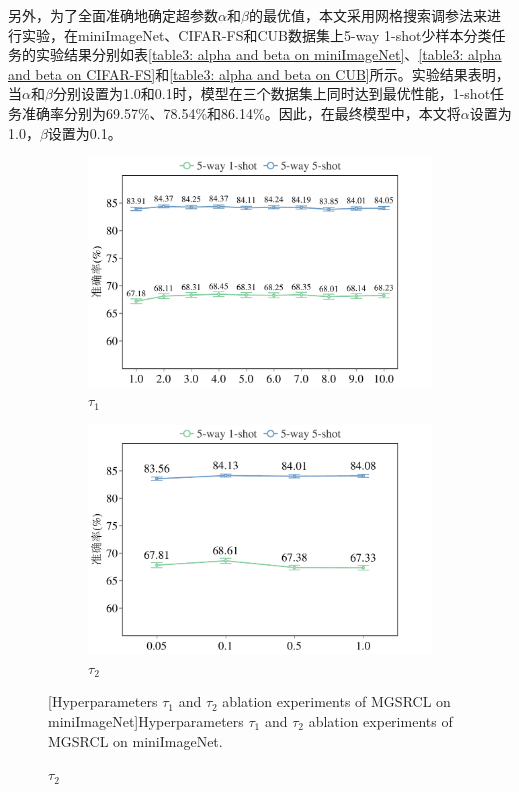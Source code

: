 另外，为了全面准确地确定超参数${\alpha}$和${\beta}$的最优值，本文采用网格搜索调参法来进行实验，在miniImageNet、CIFAR-FS和CUB数据集上5-way 1-shot少样本分类任务的实验结果分别如表\ref{table3: alpha and beta on miniImageNet}、\ref{table3: alpha and beta on CIFAR-FS}和\ref{table3: alpha and beta on CUB}所示。实验结果表明，当${\alpha}$和${\beta}$分别设置为1.0和0.1时，模型在三个数据集上同时达到最优性能，1-shot任务准确率分别为69.57\%、78.54\%和86.14\%。因此，在最终模型中，本文将$\alpha$设置为1.0，$\beta$设置为0.1。


\begin{figure}[h!]
\centering
{}
\begin{subfigure}{0.495\columnwidth}
\includegraphics[width=\columnwidth]{figures/MGSRCL/miniImageNet/t1.pdf}
\caption{$\tau_1$}
\label{figure3: t1(mini)}
\end{subfigure}
\begin{subfigure}{0.495\columnwidth}
\includegraphics[width=\columnwidth]{figures/MGSRCL/miniImageNet/t2.pdf}
\caption{$\tau_2$}
\label{figure3: t2(mini)}
\end{subfigure}
[Hyperparameters $\tau_1$ and $\tau_2$ ablation experiments of MGSRCL on miniImageNet]{Hyperparameters $\tau_1$ and $\tau_2$ ablation experiments of MGSRCL on miniImageNet.}
\label{figure3: t1 and t2 (mini)}
\end{figure}

